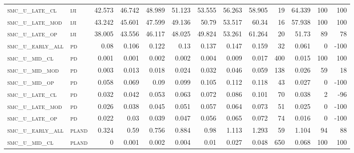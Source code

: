 \begin{landscape}
\begin{center}
\begin{footnotesize}
\begin{longtable}{llrrrrrrrr|rrr}
\textsc{smc\_u\_late\_cl  } & \textsc{iji       }   & 42.573   & 46.742   & 48.989   & 51.123   & 53.555   & 56.263   & 58.905    & 19     & 64.339        & 100           & 100             \\
\textsc{smc\_u\_late\_mod } & \textsc{iji       }   & 43.242   & 45.601   & 47.599   & 49.136   & 50.79    & 53.517   & 60.34     & 16     & 57.938        & 100           & 100             \\
\textsc{smc\_u\_late\_op  } & \textsc{iji       }   & 38.005   & 43.556   & 46.117   & 48.025   & 49.824   & 53.261   & 61.264    & 20     & 51.73         & 89            & 78              \\
\textsc{smc\_u\_early\_all} & \textsc{pd        }   & 0.08     & 0.106    & 0.122    & 0.13     & 0.137    & 0.147    & 0.159     & 32     & 0.061         & 0             & -100            \\
\textsc{smc\_u\_mid\_cl   } & \textsc{pd        }   & 0.001    & 0.001    & 0.002    & 0.002    & 0.004    & 0.009    & 0.017     & 400    & 0.015         & 100           & 100             \\
\textsc{smc\_u\_mid\_mod  } & \textsc{pd        }   & 0.003    & 0.013    & 0.018    & 0.024    & 0.032    & 0.046    & 0.059     & 138    & 0.026         & 59            & 18              \\
\textsc{smc\_u\_mid\_op   } & \textsc{pd        }   & 0.058    & 0.069    & 0.09     & 0.099    & 0.105    & 0.112    & 0.118     & 43     & 0.027         & 0             & -100            \\
\textsc{smc\_u\_late\_cl  } & \textsc{pd        }   & 0.032    & 0.042    & 0.053    & 0.063    & 0.072    & 0.086    & 0.101     & 70     & 0.038         & 2             & -96             \\
\textsc{smc\_u\_late\_mod } & \textsc{pd        }   & 0.026    & 0.038    & 0.045    & 0.051    & 0.057    & 0.064    & 0.073     & 51     & 0.025         & 0             & -100            \\
\textsc{smc\_u\_late\_op  } & \textsc{pd        }   & 0.022    & 0.03     & 0.039    & 0.047    & 0.056    & 0.065    & 0.072     & 74     & 0.016         & 0             & -100            \\
\textsc{smc\_u\_early\_all} & \textsc{pland     }   & 0.324    & 0.59     & 0.756    & 0.884    & 0.98     & 1.113    & 1.293     & 59     & 1.104         & 94            & 88              \\
\textsc{smc\_u\_mid\_cl   } & \textsc{pland     }   & 0        & 0.001    & 0.002    & 0.004    & 0.01     & 0.027    & 0.048     & 650    & 0.068         & 100           & 100             \\

\end{longtable}
\end{footnotesize}
\end{center}
\end{landscape}
